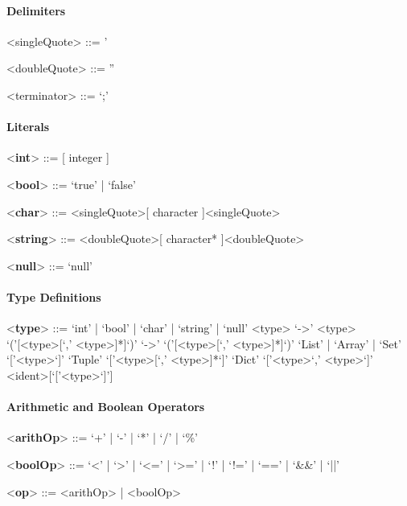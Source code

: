 \documentclass[11pt]{article} %
\begin{document}
\paragraph{Delimiters}

\begin{grammar}

<singleQuote> ::= '

<doubleQuote> ::= ''

<terminator> ::= `;'

\end{grammar}

\paragraph{Literals}

\begin{grammar}

<\textbf{int}> ::= [ integer ]

<\textbf{bool}> ::= `true' | `false'

<\textbf{char}> ::= <singleQuote>[ character ]<singleQuote>

<\textbf{string}> ::= <doubleQuote>[ character* ]<doubleQuote>

<\textbf{null}> ::= `null'

\end{grammar}

\paragraph{Type Definitions}

\begin{grammar}

<\textbf{type}> ::= `int' | `bool' | `char' | `string' | `null'
\alt <type> `->' <type>
\alt `('[<type>[`,' <type>]*]`)' `->' `('[<type>[`,' <type>]*]`)'
\alt `List' | `Array' | `Set' `['<type>`]'
\alt `Tuple' `['<type>[`,' <type>]*`]'
\alt `Dict' `['<type>`,' <type>`]'
\alt <ident>[`['<type>`]']

\end{grammar}

\paragraph{Arithmetic and Boolean Operators}

\begin{grammar}

<\textbf{arithOp}> ::= `+' | `-' | `*' | `/' | `\%'

<\textbf{boolOp}> ::= `<' | `>' | `<=' | `>=' | `!' | `!=' | `==' | `\&\&' | `||'

<\textbf{op}> ::= <arithOp> | <boolOp> 

\end{grammar}
\end{document}
